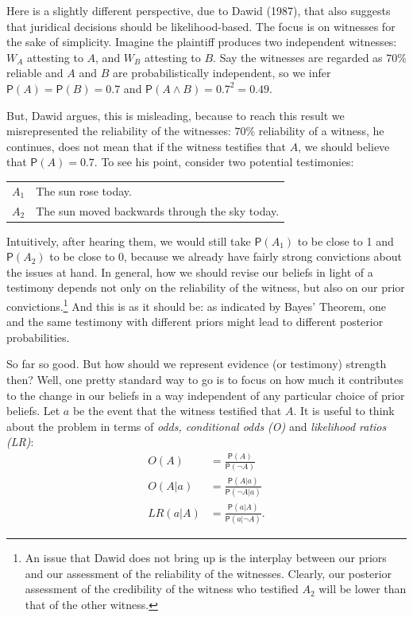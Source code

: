 \documentclass[
  10pt,
  dvipsnames,enabledeprecatedfontcommands]{scrartcl}
\newcommand{\n}{\neg}
\newcommand{\et}{\wedge}
\newcommand{\pr}[1]{\mathsf{P}(#1)}
\begin{document}
Here is a slightly different perspective, due to Dawid (1987), that also
suggests that juridical decisions should be likelihood-based. The focus
is on witnesses for the sake of simplicity. Imagine the plaintiff
produces two independent witnesses: \(W_A\) attesting to \(A\), and
\(W_B\) attesting to \(B\). Say the witnesses are regarded as \(70\%\)
reliable and \(A\) and \(B\) are probabilistically independent, so we
infer \(\pr{A}=\pr{B}=0.7\) and \(\pr{A\et B}=0.7^2=0.49\).

But, Dawid argues, this is misleading, because to reach this result we
misrepresented the reliability of the witnesses: \(70\%\) reliability of
a witness, he continues, does not mean that if the witness testifies
that \(A\), we should believe that \(\pr{A}=0.7\). To see his point,
consider two potential testimonies:

\begin{center}
\begin{tabular}
{@{}ll@{}}
\toprule
  $A_1$ & The sun rose today. \\
   $A_2$ & The sun moved backwards through the sky today.\\
\bottomrule
\end{tabular}
\end{center}

\noindent     Intuitively, after hearing them, we would still take
\(\pr{A_1}\) to be close to 1 and \(\pr{A_2}\) to be close to 0, because
we already have fairly strong convictions about the issues at hand. In
general, how we should revise our beliefs in light of a testimony
depends not only on the reliability of the witness, but also on our
prior
convictions.\footnote{An issue that Dawid does not bring up is the interplay between our priors and our assessment of the reliability of the witnesses. Clearly, our posterior assessment of the credibility of the witness who testified $A_2$ will be lower than that of the other witness.}
And this is as it should be: as indicated by Bayes' Theorem, one and the
same testimony with different priors might lead to different posterior
probabilities.

So far so good. But how should we represent evidence (or testimony)
strength then? Well, one pretty standard way to go is to focus on how
much it contributes to the change in our beliefs in a way independent of
any particular choice of prior beliefs. Let \(a\) be the event that the
witness testified that \(A\). It is useful to think about the problem in
terms of \emph{odds, conditional odds (O)} and
\emph{likelihood ratios (LR)}:
\begin{align*} O(A)  & = \frac{\pr{A}}{\pr{\n A}}\\
 O(A\vert a) &= \frac{\pr{A\vert a}}{\pr{\n A \vert a}}  \\
 LR(a\vert A) &= \frac{\pr{a\vert A}}{\pr{a\vert \n A}}. 
\end{align*}
\end{document}
